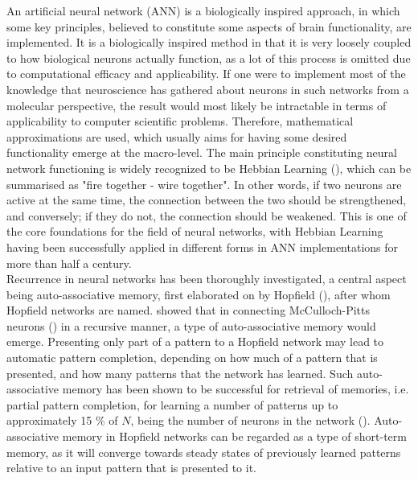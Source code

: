An artificial neural network (ANN) is a biologically inspired approach, in which some key principles, believed to constitute some aspects of brain functionality, are implemented. It is a biologically inspired method in that it is very loosely coupled to how biological neurons actually function, as a lot of this process is omitted due to computational efficacy and applicability. If one were to implement most of the knowledge that neuroscience has gathered about neurons in such networks from a molecular perspective, the result would most likely be intractable in terms of applicability to computer scientific problems. Therefore, mathematical approximations are used, which usually aims for having some desired functionality emerge at the macro-level. The main principle constituting neural network functioning is widely recognized to be Hebbian Learning (\cite{Hebb1949}), which can be summarised as "fire together - wire together". In other words, if two neurons are active at the same time, the connection between the two should be strengthened, and conversely; if they do not, the connection should be weakened. This is one of the core foundations for the field of neural networks, with Hebbian Learning having been successfully applied in different forms in ANN implementations for more than half a century.
\\

Recurrence in neural networks has been thoroughly investigated, a central aspect being auto-associative memory, first elaborated on by Hopfield (\cite{Hopfield1982}), after whom Hopfield networks are named. \cite{Hopfield1982} showed that in connecting McCulloch-Pitts neurons (\cite{McCulloch1943}) in a recursive manner, a type of auto-associative memory would emerge. Presenting only part of a pattern to a Hopfield network may lead to automatic pattern completion, depending on how much of a pattern that is presented, and how many patterns that the network has learned. Such auto-associative memory has been shown to be successful for retrieval of memories, i.e. partial pattern completion, for learning a number of patterns up to approximately 15 \% of $N$, being the number of neurons in the network (\cite{Hopfield1982}). Auto-associative memory in Hopfield networks can be regarded as a type of short-term memory, as it will converge towards steady states of previously learned patterns relative to an input pattern that is presented to it.

